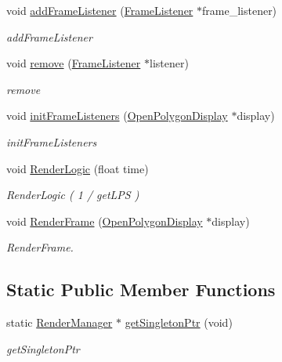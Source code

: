 \begin{DoxyCompactItemize}
\item 
void \hyperlink{classEngine_1_1RenderManager_a463e244d820df2c2df726780cd02a994}{add\+Frame\+Listener} (\hyperlink{classEngine_1_1FrameListener}{Frame\+Listener} $\ast$frame\+\_\+listener)
\begin{DoxyCompactList}\small\item\em add\+Frame\+Listener \end{DoxyCompactList}\item 
void \hyperlink{classEngine_1_1RenderManager_ad7b499716987b670c03889145f31de5a}{remove} (\hyperlink{classEngine_1_1FrameListener}{Frame\+Listener} $\ast$listener)
\begin{DoxyCompactList}\small\item\em remove \end{DoxyCompactList}\item 
void \hyperlink{classEngine_1_1RenderManager_a5cab7b1cabe975c0da11ca84496cbef7}{init\+Frame\+Listeners} (\hyperlink{classEngine_1_1OpenPolygonDisplay}{Open\+Polygon\+Display} $\ast$display)
\begin{DoxyCompactList}\small\item\em init\+Frame\+Listeners \end{DoxyCompactList}\item 
void \hyperlink{classEngine_1_1RenderManager_a245010f7acbd72c4c8e5b8cf11c2ffff}{Render\+Logic} (float time)
\begin{DoxyCompactList}\small\item\em Render\+Logic ( 1 / get\+L\+P\+S ) \end{DoxyCompactList}\item 
void \hyperlink{classEngine_1_1RenderManager_ad387f88864c0fb6815e59fd884ea8541}{Render\+Frame} (\hyperlink{classEngine_1_1OpenPolygonDisplay}{Open\+Polygon\+Display} $\ast$display)
\begin{DoxyCompactList}\small\item\em Render\+Frame. \end{DoxyCompactList}\end{DoxyCompactItemize}
\subsection*{Static Public Member Functions}
\begin{DoxyCompactItemize}
\item 
static \hyperlink{classEngine_1_1RenderManager}{Render\+Manager} $\ast$ \hyperlink{classEngine_1_1RenderManager_adb380605afe276a5b9afec04deab1bac}{get\+Singleton\+Ptr} (void)
\begin{DoxyCompactList}\small\item\em get\+Singleton\+Ptr \end{DoxyCompactList}\end{DoxyCompactItemize}


